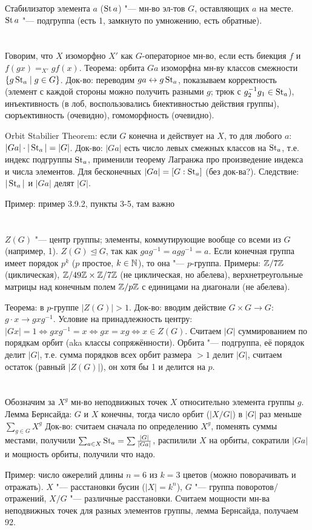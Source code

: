 Стабилизатор элемента $a$ ($\operatorname{St} a$) "--- мн-во эл-тов $G$, оставляющих $a$ на месте.
$\operatorname{St} a$ "--- подгруппа (есть 1, замкнуто по умножению, есть обратные).

\section{} %
Говорим, что $X$ изоморфно $X'$ как $G$-операторное мн-во, если
есть биекция $f$ и $f(gx)=_{X'}gf(x)$.
Теорема: орбита $Ga$ изоморфна мн-ву классов смежности $\{ g\operatorname{St}_a \mid g \in G \}$.
Док-во: переводим $ga \leftrightarrow g \operatorname{St}_a$, показываем корректность (элемент с каждой стороны можно получить
разными $g$; трюк с $g_2^{-1}g_1 \in \operatorname{St}_a$), инъективность (в лоб, воспользовались биективностью
действия группы), сюръективность (очевидно), гомоморфность (очевидно).

Orbit Stabilier Theorem: если $G$ конечна и действует на $X$, то для любого $a$:
$|Ga| \cdot |\operatorname{St}_a| = |G|$.
Док-во: $|Ga|$ есть число левых смежных классов на $\operatorname{St}_a$, т.е. индекс подгруппы $\operatorname{St}_a$,
применили теорему Лагранжа про произведение индекса и числа элементов.
Для бесконечных $|Ga|=[G:\operatorname{St}_a]$ (без док-ва?).
Следствие: $|\operatorname{St}_a|$ и $|Ga|$ делят $|G|$.

Пример: \TODO пример 3.9.2, пункты 3-5, там важно

\section{} %
$Z(G)$ "--- центр группы; элементы, коммутирующие вообще со всеми из $G$ (например, 1).
$Z(G) \unlhd G$, так как $gag^{-1}=agg^{-1}=a$.
Если конечная группа имеет порядок $p^k$ ($p$ простое, $k\in \mathbb{N}$), то она "--- $p$-группа.
Примеры: $\mathbb{Z}/7\mathbb{Z}$ (циклическая), $\mathbb{Z}/49\mathbb{Z} \times \mathbb{Z}/7\mathbb{Z}$ (не циклическая, но абелева),
верхнетреугольные матрицы над конечным полем $\mathbb{Z}/p\mathbb{Z}$ с единицами на диагонали (не абелева).

Теорема: в $p$-группе $|Z(G)|>1$.
Док-во: вводим действие $G\times G \to G$: $g \cdot x \to gxg^{-1}$.
Условие на принадлежность центру: $|Gx|=1 \iff gxg^{-1} = x \iff gx = xg \iff x \in Z(G)$.
Считаем $|G|$ суммированием по порядкам орбит (aka классы сопряжённости).
Орбита "--- подгруппа, её порядок делит $|G|$, т.е. сумма
порядков всех орбит размера $>1$ делит $|G|$, считаем остаток (равный $|Z(G)|$), он хотя
бы 1 и делится на $p$.

\section{} %
Обозначим за $X^g$ мн-во неподвижных точек $X$ относительно элемента группы $g$.
Лемма Бернсайда: $G$ и $X$ конечны, тогда число орбит ($|X/G|$) в $|G|$ раз меньше $\sum_{g \in G} X^g$
Док-во: считаем сначала по определению $X^g$, поменять суммы местами,
получили $\sum_{a\in X} \operatorname{St}_a=\sum \frac{|G|}{|Ga|}$, распилили $X$ на орбиты,
сократили $|Ga|$ и мощность орбиты, получили что надо.

Пример: число ожерелий длины $n=6$ из $k=3$ цветов (можно поворачивать и отражать).
$X$ "--- расстановки бусин ($|X|=k^n$), $G$ "--- группа поворотов/отражений, $X/G$ "--- различные
расстановки.
Считаем мощности мн-ва неподвижных точек для разных элементов группы, лемма Бернсайда,
получаем 92.
